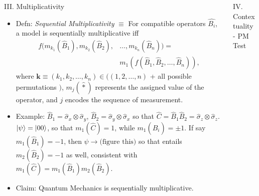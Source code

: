 \documentclass[final,hyperref={pdfpagelabels=false}]{beamer}
\begin{document}
\begin{frame}[t]
\begin{columns}[c]
\begin{column}{.69\textwidth}
\begin{columns}[c]
\begin{column}{.48\textwidth}
\begin{block}{III. Multiplicativity}
\begin{itemize}
            \item Defn: \emph{Sequential Multiplicativity} $\equiv$ For compatible operators $\hat{B_i}$, a model is sequentially multiplicative iff 
              \begin{align} f(m_{k_1}(\hat{B}_1),m_{k_2}(\hat{B}_2),&\dots,m_{k_n}(\hat{B}_n)) = \\
                                                                    &m_1(f(\hat{B}_1,\hat{B}_2,\dots,\hat{B}_n)),
              \end{align}
              where $\mathbf k \equiv (k_1,k_2,\dots,k_n) \in ((1,2,\dots,n)$ + all possible permutations $)$, $m_j(\hat *)$ represents the assigned value of the operator, and $j$ encodes the sequence of measurement.

            \item Example: $\hat B_1 = \hat {\sigma} _x \otimes \hat {\sigma}_y$, $\hat B_2 = \hat {\sigma} _y \otimes \hat {\sigma}_x$ so that $\hat C = \hat B_1 \hat B_2 = \hat \sigma _z \otimes \hat \sigma _z$. $\ket {\psi}=\ket{00}$, so that $m_1(\hat C)=1$, while $m_1(\hat B_i)=\pm 1$. If say $m_1(\hat B_1)=-1$, then ${\psi} \to \text{(figure this)}$ so that entails $m_2(\hat B_2)=-1$ as well, consistent with $m_1(\hat C)=m_1(\hat B_1)m_2(\hat B_2)$.

            \item Claim: Quantum Mechanics is sequentially multiplicative.

            \end{itemize}

          \end{block}

        \end{column}

        \begin{column}{.46\textwidth}

          \begin{block}{IV. Contextuality - PM Test}



\end{block}
\end{column}
\end{columns}
\end{column}
\end{columns}
\end{frame}
\end{document}
